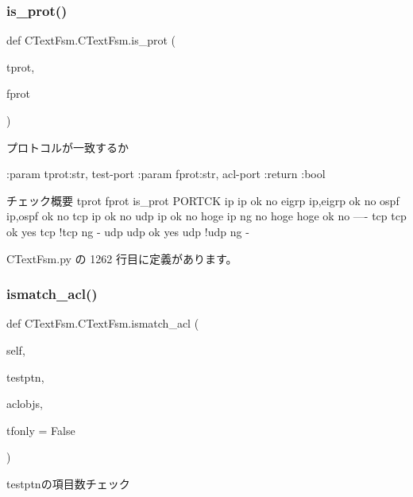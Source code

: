 \subsubsection{\texorpdfstring{is\_prot()}{is\_prot()}}
{\footnotesize\ttfamily def C\+Text\+Fsm.\+C\+Text\+Fsm.\+is\+\_\+prot (\begin{DoxyParamCaption}\item[{}]{tprot,  }\item[{}]{fprot }\end{DoxyParamCaption})\hspace{0.3cm}{\ttfamily [static]}}

\begin{DoxyVerb}プロトコルが一致するか

:param  tprot:str, test-port
:param  fprot:str, acl-port
:return :bool

チェック概要
    tprot   fprot       is_prot PORTCK
    ip      ip          ok      no
    eigrp   ip,eigrp    ok      no
    ospf    ip,ospf     ok      no
    tcp     ip          ok      no
    udp     ip          ok      no
    hoge    ip          ng      no
    hoge    hoge        ok      no
----
    tcp     tcp         ok      yes
    tcp     !tcp        ng      -
    udp     udp         ok      yes
    udp     !udp        ng      -
\end{DoxyVerb}
 

 C\+Text\+Fsm.\+py の 1262 行目に定義があります。

\mbox{\label{classCTextFsm_1_1CTextFsm_a4248a8d77fdc84c340d4d9d1f5b2790e}} 
\subsubsection{\texorpdfstring{ismatch\_acl()}{ismatch\_acl()}}
{\footnotesize\ttfamily def C\+Text\+Fsm.\+C\+Text\+Fsm.\+ismatch\+\_\+acl (\begin{DoxyParamCaption}\item[{}]{self,  }\item[{}]{testptn,  }\item[{}]{aclobjs,  }\item[{}]{tfonly = {\ttfamily False} }\end{DoxyParamCaption})}



testptnの項目数チェック 

